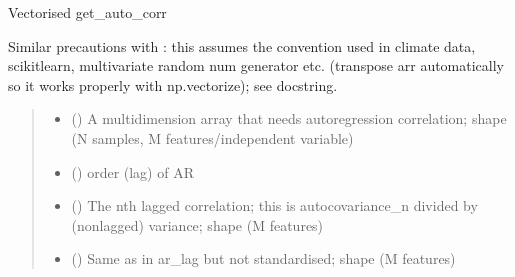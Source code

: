 \documentclass[letterpaper,10pt,english]{sphinxmanual}
\begin{document}
\begin{fulllineitems}
\label{\detokenize{kalman:glomar_gridding.autocorrelation.compute_autocorrelation.get_auto_corr_vectorize}}
\pysigstartsignatures
\pysiglinewithargsret
{}
{\sphinxparamcomma {}}
{}
\pysigstopsignatures
\sphinxAtStartPar
Vectorised get\_auto\_corr

\sphinxAtStartPar
Similar precautions with :
this assumes the convention used in climate data,
scikit\sphinxhyphen{}learn, multivariate random num generator etc.
(transpose arr automatically so it works properly with np.vectorize);
see  docstring.
\begin{quote}\begin{description}
\begin{itemize}
\item {}
\sphinxAtStartPar
{} () \textendash{} A multi\sphinxhyphen{}dimension array that needs autoregression correlation;
shape  (N samples, M features/independent variable)

\item {}
\sphinxAtStartPar
{} () \textendash{} order (lag) of AR

\end{itemize}

\sphinxAtStartPar
\begin{itemize}
\item {}
\sphinxAtStartPar
{} () \textendash{} The n\sphinxhyphen{}th lagged correlation; this is
autocovariance\_n divided by (non\sphinxhyphen{}lagged) variance;
shape  (M features)

\item {}
\sphinxAtStartPar
{} () \textendash{} Same as in ar\_lag but not standardised;
shape  (M features)


\end{itemize}
\end{description}
\end{quote}
\end{fulllineitems}
\end{document}
